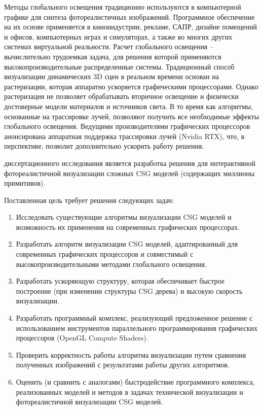 Методы глобального освещения традиционно используются в компьютерной графике для синтеза фотореалистичных изображений. Программное обеспечение на их основе применяется в киноиндустрии, рекламе, САПР, дизайне помещений и офисов, компьютерных играх и симуляторах, а также во многих других системах виртуальной реальности. Расчет глобального освещения – вычислительно трудоемкая задача, для решения которой применяются высокопроизводительные распределенные системы.
Традиционный способ визуализации динамических 3D сцен в реальном времени основан на растеризации, которая аппаратно ускоряется графическими процессорами. Однако растеризация не позволяет обрабатывать вторичное освещение и физически достоверные модели материалов и источников света. В то время как алгоритмы, основанные на трассировке лучей, позволяют получить все необходимые эффекты глобального освещения. Ведущими производителями графических процессоров анонсирована аппаратная поддержка трассировки лучей (Nvidia RTX), что, в перспективе, позволит дополнительно ускорить работу решения.

{\aim} диссертационного исследования является разработка решения для интерактивной фотореалистичной визуализации сложных CSG моделей (содержащих миллионы примитивов).

Поставленная цель требует решения следующих задач:
\begin{enumerate}
  \item Исследовать существующие алгоритмы визуализации CSG моделей и возможность их применения на современных графических процессорах.
  \item Разработать алгоритм визуализации CSG моделей, адаптированный для современных графических процессоров и совместимый с высокопроизводительными методами глобального освещения.
  \item Разработать ускоряющую структуру, которая обеспечивает быстрое построение (при изменении структуры CSG дерева) и высокую скорость визуализации.
  \item Разработать программный комплекс, реализующий предложенное решение с использованием инструментов параллельного программирования графических процессоров (OpenGL Compute Shaders).
  \item Проверить корректность работы алгоритма визуализации путем сравнения полученных изображений с результатами работы других алгоритмов.
  \item Оценить (и сравнить с аналогами) быстродействие программного комплекса, реализованных моделей и методов в задачах технической визуализации и фотореалистичной визуализации CSG моделей.
\end{enumerate}

